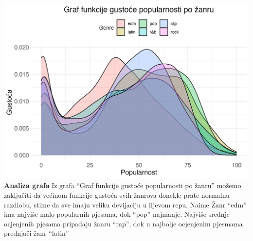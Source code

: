 \documentclass[
]{article}
\begin{document}
\includegraphics{graf3.png} \textbf{Analiza grafa} Iz grafa ``Graf
funkcije gustoće popularnosti po žanru'' možemo zaključiti da većinom
funkcije gustoća svih žanrova donekle prate normalnu razdiobu, stime da
sve imaju veliku devijaciju u lijevom repu. Naime Žanr ``edm'' ima
najviše malo popularnih pjesama, dok ``pop'' najmanje. Najviše srednje
ocjenjenih pjesama pripadaju žanru ``rap'', dok u najbolje ocjenjenim
pjesmama prednjači žanr ``latin''
\end{document}
